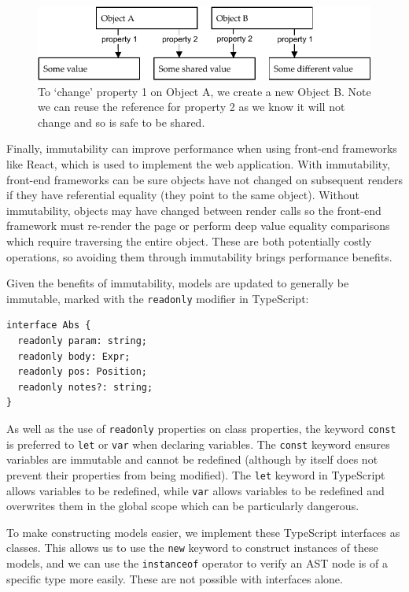 \documentclass[a4paper,fleqn,oneside,12pt]{report}
\begin{document}
{\centering \begin{figure}[h!]
  \centering
  \includegraphics[width=\linewidth]{images/immutability.pdf}
  \caption{To `change' property 1 on Object A, we create a new Object B. Note we can reuse the reference for property 2 as we know it will not change and so is safe to be shared.}
\end{figure} \par}

Finally, immutability can improve performance when using front-end frameworks like React, which is used to implement the web application. With immutability, front-end frameworks can be sure objects have not changed on subsequent renders if they have referential equality (they point to the same object). Without immutability, objects may have changed between render calls so the front-end framework must re-render the page or perform deep value equality comparisons which require traversing the entire object. These are both potentially costly operations, so avoiding them through immutability brings performance benefits.

Given the benefits of immutability, models are updated to generally be immutable, marked with the \texttt{readonly} modifier in TypeScript:

\begin{verbatim}
interface Abs {
  readonly param: string;
  readonly body: Expr;
  readonly pos: Position;
  readonly notes?: string;
}
\end{verbatim}
As well as the use of \texttt{readonly} properties on class properties, the keyword \texttt{const} is preferred to \texttt{let} or \texttt{var} when declaring variables. The \texttt{const} keyword ensures variables are immutable and cannot be redefined (although by itself does not prevent their properties from being modified). The \texttt{let} keyword in TypeScript allows variables to be redefined, while \texttt{var} allows variables to be redefined and overwrites them in the global scope which can be particularly dangerous.

To make constructing models easier, we implement these TypeScript interfaces as classes. This allows us to use the \texttt{new} keyword to construct instances of these models, and we can use the \texttt{instanceof} operator to verify an AST node is of a specific type more easily. These are not possible with interfaces alone.
\end{document}
